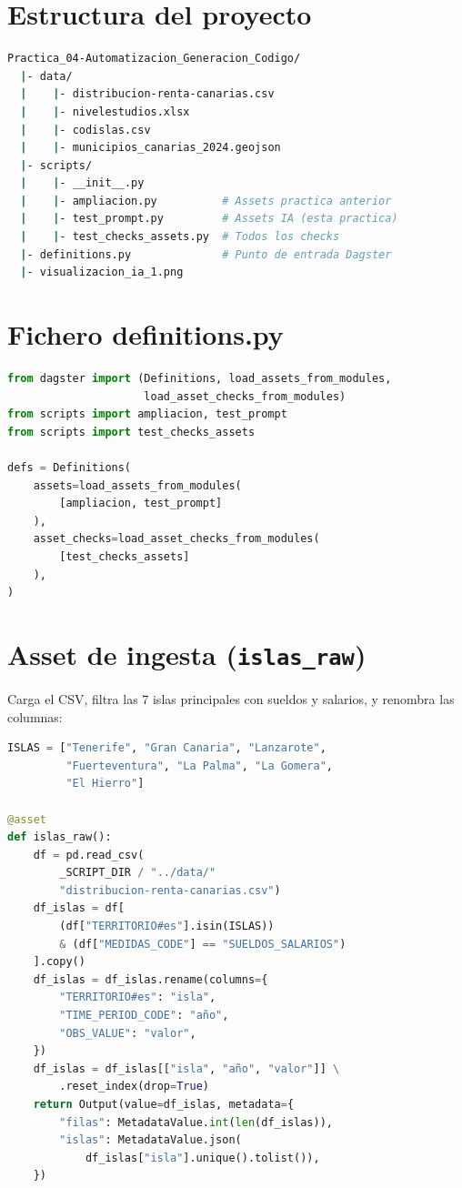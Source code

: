 \documentclass[11pt]{report}
\begin{document}
\section{Estructura del proyecto}

\begin{lstlisting}[style=mystyle, language=bash, caption={Estructura del proyecto}]
Practica_04-Automatizacion_Generacion_Codigo/
  |- data/
  |    |- distribucion-renta-canarias.csv
  |    |- nivelestudios.xlsx
  |    |- codislas.csv
  |    |- municipios_canarias_2024.geojson
  |- scripts/
  |    |- __init__.py
  |    |- ampliacion.py          # Assets practica anterior
  |    |- test_prompt.py         # Assets IA (esta practica)
  |    |- test_checks_assets.py  # Todos los checks
  |- definitions.py              # Punto de entrada Dagster
  |- visualizacion_ia_1.png
\end{lstlisting}

\section{Fichero definitions.py}

\begin{lstlisting}[style=mystyle, language=Python, caption={definitions.py}]
from dagster import (Definitions, load_assets_from_modules,
                     load_asset_checks_from_modules)
from scripts import ampliacion, test_prompt
from scripts import test_checks_assets

defs = Definitions(
    assets=load_assets_from_modules(
        [ampliacion, test_prompt]
    ),
    asset_checks=load_asset_checks_from_modules(
        [test_checks_assets]
    ),
)
\end{lstlisting}

\section{Asset de ingesta (\texttt{islas\_raw})}

Carga el CSV, filtra las 7 islas principales con sueldos y salarios, y renombra las columnas:

\begin{lstlisting}[style=mystyle, language=Python, caption={Asset de ingesta}]
ISLAS = ["Tenerife", "Gran Canaria", "Lanzarote",
         "Fuerteventura", "La Palma", "La Gomera",
         "El Hierro"]

@asset
def islas_raw():
    df = pd.read_csv(
        _SCRIPT_DIR / "../data/"
        "distribucion-renta-canarias.csv")
    df_islas = df[
        (df["TERRITORIO#es"].isin(ISLAS))
        & (df["MEDIDAS_CODE"] == "SUELDOS_SALARIOS")
    ].copy()
    df_islas = df_islas.rename(columns={
        "TERRITORIO#es": "isla",
        "TIME_PERIOD_CODE": "año",
        "OBS_VALUE": "valor",
    })
    df_islas = df_islas[["isla", "año", "valor"]] \
        .reset_index(drop=True)
    return Output(value=df_islas, metadata={
        "filas": MetadataValue.int(len(df_islas)),
        "islas": MetadataValue.json(
            df_islas["isla"].unique().tolist()),
    })
\end{lstlisting}
\end{document}
